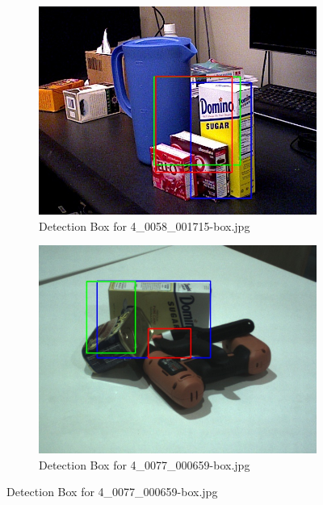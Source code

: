 \documentclass[10.5pt,a4paper]{article}
\begin{document}
\begin{figure} [h]
    \vspace{2em}

    \begin{subfigure}{0.45\textwidth}
        \centering
        \includegraphics[width=\textwidth]{img/4_0058_001715-box.jpg}
        \caption{Detection Box for 4\_0058\_001715-box.jpg}
        \label{fig:img9}
    \end{subfigure}
    \hfill
    \begin{subfigure}{0.45\textwidth}
        \centering
        \includegraphics[width=\textwidth]{img/4_0077_000659-box.jpg}
        \caption{Detection Box for 4\_0077\_000659-box.jpg}
        \label{fig:img10}
    \end{subfigure}


\end{figure}
\end{document}
